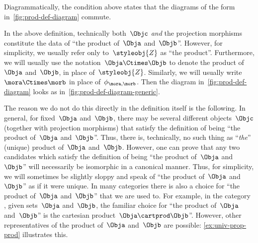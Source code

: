 \begin{marginfigure}
    \centering
    \caption{}
    \label{fig:prod-def-diagram}
\end{marginfigure}
\begin{remark}
    \label{re:prod-comm-diag}
    Diagrammatically, the condition above states that the diagrams of the form in~\cref{fig:prod-def-diagram} commute.
\end{remark}

\begin{marginfigure}
    \centering
    \caption{}
    \label{fig:prod-def-diagram-generic}
\end{marginfigure}

\begin{remark}
    \label{prod unique up to iso}
    In the above definition, technically both~$\Objc$ \emph{and} the projection morphisms constitute the data of ``the product of~$\Obja$ and~$\Objb$''.
    However, for simplicity, we usually refer only to~$\styleobj{Z}$ as ``the product''.
    Furthermore, we will usually use the notation~$\Obja \Ctimes \Objb$ to denote the product of~$\Obja$ and~$\Objb$, in place of~$\styleobj{Z}$.
    Similarly, we will usually write~$\mora \Ctimes \morb$ in place of~$\phi_{\mora, \morb}$.
    Then the diagram in~\cref{fig:prod-def-diagram} looks as in~\cref{fig:prod-def-diagram-generic}.

    The reason we do not do this directly in the definition itself is the following.
    In general, for fixed~$\Obja$ and~$\Objb$, there may be several different objects~$\Objc$ (together with projection morphisms) that satisfy the definition of being ``the product of~$\Obja$ and~$\Objb$''.
    Thus, there is, technically, no such thing as ``\emph{the}'' (unique) product of~$\Obja$ and~$\Objb$.
    However, one can prove that any two candidates which satisfy the definition of being ``the product of~$\Obja$ and~$\Objb$'' will necessarily be isomorphic in a canonical manner.
    Thus, for simplicity, we will sometimes be slightly sloppy and speak of ``the product of~$\Obja$ and~$\Objb$'' as if it were unique.
    In many categories there is also a choice for ``the product of~$\Obja$ and~$\Objb$'' that we are used to.
    For example, in the category \Set, given sets~$\Obja$ and~$\Objb$, the familiar choice for ``the product of~$\Obja$ and~$\Objb$'' is the cartesian product~$\Obja \cartprod \Objb$''.
    However, other representatives of the product of~$\Obja$ and~$\Objb$ are possible: \cref{ex:univ-prop-prod} illustrates this.
\end{remark}

